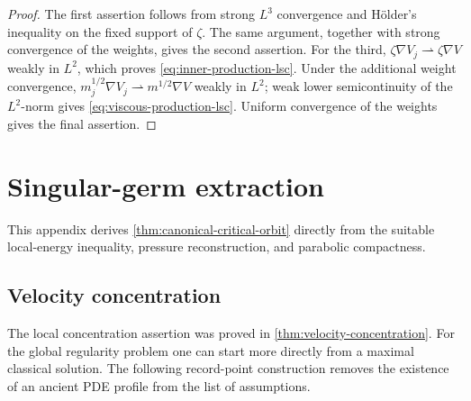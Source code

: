 \documentclass[11pt]{amsart}
\numberwithin{equation}{section}
\theoremstyle{plain}
\theoremstyle{definition}
\theoremstyle{remark}
\begin{document}
\begin{proof}
The first assertion follows from strong \(L^3\) convergence and H\"older's
inequality on the fixed support of \(\zeta\).  The same argument, together
with strong convergence of the weights, gives the second assertion.  For the
third, \(\zeta\nabla V_j\rightharpoonup\zeta\nabla V\) weakly in
\(L^2\), which proves \eqref{eq:inner-production-lsc}.  Under the additional
weight convergence, \(m_j^{1/2}\nabla V_j\rightharpoonup
m^{1/2}\nabla V\) weakly in \(L^2\); weak lower semicontinuity of the
\(L^2\)-norm gives \eqref{eq:viscous-production-lsc}.  Uniform convergence of
the weights gives the final assertion.
\end{proof}

\section{Singular-germ extraction}
\label{app:critical-orbit}

This appendix derives \cref{thm:canonical-critical-orbit} directly from the
suitable local-energy inequality, pressure reconstruction, and parabolic
compactness.

\subsection{Velocity concentration}
\label{app:velocity-concentration}

The local concentration assertion was proved in
\cref{thm:velocity-concentration}.  For the global regularity problem one can
start more directly from a maximal classical solution.  The following
record-point construction removes the existence of an ancient PDE profile
from the list of assumptions.
\end{document}
